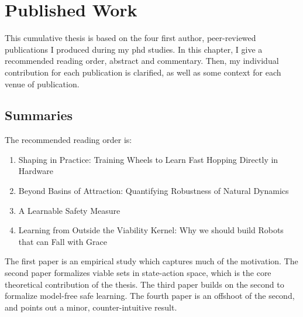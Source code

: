 
\chapter{Published Work} \label{chap:pubs}
This cumulative thesis is based on the four first author, peer-reviewed publications I produced during my phd studies. In this chapter, I give a recommended reading order, abstract and commentary. Then, my individual contribution for each publication is clarified, as well as some context for each venue of publication.

\section{Summaries}
The recommended reading order is:
\begin{enumerate}
    \item Shaping in Practice: Training Wheels to Learn Fast Hopping Directly in Hardware
    \item Beyond Basins of Attraction: Quantifying Robustness of Natural Dynamics
    \item A Learnable Safety Measure
    \item Learning from Outside the Viability Kernel: Why we should build Robots that can Fall with Grace
\end{enumerate}
The first paper is an empirical study which captures much of the motivation. The second paper formalizes viable sets in state-action space, which is the core theoretical contribution of the thesis. The third paper builds on the second to formalize model-free safe learning. The fourth paper is an offshoot of the second, and points out a minor, counter-intuitive result.

